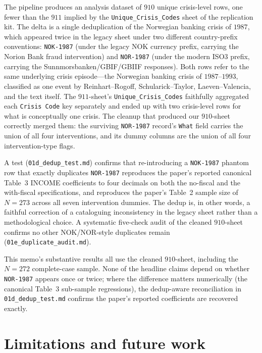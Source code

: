 \documentclass[11pt]{article}
\begin{document}
The pipeline produces an analysis dataset of $910$ unique
crisis-level rows, one fewer than the $911$ implied by the
\texttt{Unique\_Crisis\_Codes} sheet of the replication kit. The
delta is a single deduplication of the Norwegian banking crisis of
$1987$, which appeared twice in the legacy sheet under two
different country-prefix conventions: \texttt{NOK-1987} (under the
legacy NOK currency prefix, carrying the Norion Bank fraud
intervention) and \texttt{NOR-1987} (under the modern ISO3 prefix,
carrying the Sunnmorsbanken/GBIF/GBIIF responses). Both rows refer
to the same underlying crisis episode---the Norwegian banking
crisis of $1987$--$1993$, classified as one event by
Reinhart--Rogoff, Schularick--Taylor, Laeven--Valencia, and the
\citeauthor{metrick2024} text itself. The $911$-sheet's
\texttt{Unique\_Crisis\_Codes} faithfully aggregated each
\texttt{Crisis Code} key separately and ended up with two
crisis-level rows for what is conceptually one crisis. The cleanup
that produced our $910$-sheet correctly merged them: the
surviving \texttt{NOR-1987} record's \texttt{What} field carries
the union of all four interventions, and its dummy columns are the
union of all four intervention-type flags.

A test (\texttt{01d\_dedup\_test.md}) confirms that
re-introducing a \texttt{NOK-1987} phantom row that exactly
duplicates \texttt{NOR-1987} reproduces the paper's reported
canonical Table~3 INCOME coefficients to four decimals on both
the no-fiscal and the with-fiscal specifications, and reproduces
the paper's Table~2 sample size of $N = 273$ across all seven
intervention dummies. The dedup is, in other words, a faithful
correction of a cataloguing inconsistency in the legacy
sheet rather than a methodological choice. A systematic five-check
audit of the cleaned $910$-sheet confirms no other
NOK/NOR-style duplicates remain
(\texttt{01e\_duplicate\_audit.md}).

This memo's substantive results all use the cleaned $910$-sheet,
including the $N = 272$ complete-case sample. None of the headline
claims depend on whether \texttt{NOR-1987} appears once or twice;
where the difference matters numerically (the canonical Table~3
sub-sample regressions), the dedup-aware reconciliation in
\texttt{01d\_dedup\_test.md} confirms the paper's reported
coefficients are recovered exactly.

\section{Limitations and future work}
\end{document}
